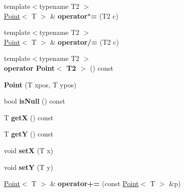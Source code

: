 \begin{DoxyCompactItemize}
\item 
\hypertarget{class_point_af661fc31fd0d5e68272dd0b5fd89c098}{
{\footnotesize template$<$typename T2 $>$ }\\\hyperlink{class_point}{Point}$<$ T $>$ \& {\bfseries operator$\ast$=} (T2 c)}
\label{class_point_af661fc31fd0d5e68272dd0b5fd89c098}

\item 
\hypertarget{class_point_a1eea2586fd60dc3afd91fa48a2243d34}{
{\footnotesize template$<$typename T2 $>$ }\\\hyperlink{class_point}{Point}$<$ T $>$ \& {\bfseries operator/=} (T2 c)}
\label{class_point_a1eea2586fd60dc3afd91fa48a2243d34}

\item 
\hypertarget{class_point_ae81e26af57b63fc89ed704b1035cf149}{
{\footnotesize template$<$typename T2 $>$ }\\{\bfseries operator Point$<$ T2 $>$} () const }
\label{class_point_ae81e26af57b63fc89ed704b1035cf149}

\item 
\hypertarget{class_point_afee21757359d199f4c69d9701e1dc7e2}{
{\bfseries Point} (T xpos, T ypos)}
\label{class_point_afee21757359d199f4c69d9701e1dc7e2}

\item 
\hypertarget{class_point_ac9b271484c83c7e1d9a6f07ab11f3f68}{
bool {\bfseries isNull} () const }
\label{class_point_ac9b271484c83c7e1d9a6f07ab11f3f68}

\item 
\hypertarget{class_point_ae414e3bdd4f00190e7c4a999e9020f6c}{
T {\bfseries getX} () const }
\label{class_point_ae414e3bdd4f00190e7c4a999e9020f6c}

\item 
\hypertarget{class_point_a6b5641f2ef6c44b88f14276150dce919}{
T {\bfseries getY} () const }
\label{class_point_a6b5641f2ef6c44b88f14276150dce919}

\item 
\hypertarget{class_point_a0e395ed682dce1b506117001ad7b4359}{
void {\bfseries setX} (T x)}
\label{class_point_a0e395ed682dce1b506117001ad7b4359}

\item 
\hypertarget{class_point_af95aee5daa3bc93b4eb31867f4be5a2b}{
void {\bfseries setY} (T y)}
\label{class_point_af95aee5daa3bc93b4eb31867f4be5a2b}

\item 
\hypertarget{class_point_a2c82fe84181ba81c0cb13f42b2e5f8f6}{
\hyperlink{class_point}{Point}$<$ T $>$ \& {\bfseries operator+=} (const \hyperlink{class_point}{Point}$<$ T $>$ \&p)}
\label{class_point_a2c82fe84181ba81c0cb13f42b2e5f8f6}


\end{DoxyCompactItemize}
